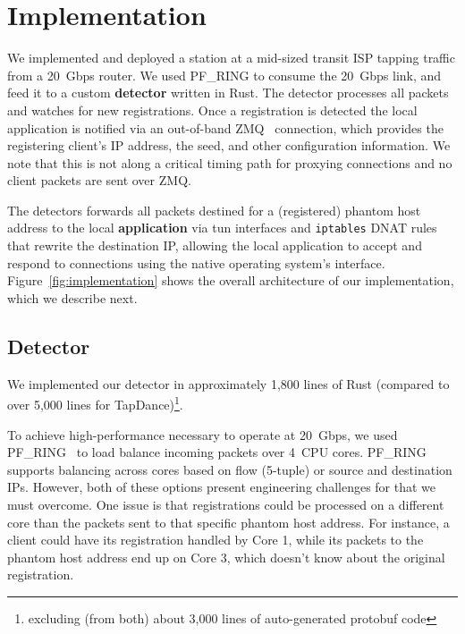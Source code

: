 \documentclass[sigconf]{acmart}
\begin{document}
\TabApplications


\section{Implementation}
\label{sec:implementation}

We implemented \scheme and deployed a station at a mid-sized transit ISP tapping 
traffic from a 20~Gbps router. We used PF\_RING to
consume the 20~Gbps link, and feed it to a custom \textbf{detector} written in Rust. The
detector processes all packets and watches for new registrations. Once a registration 
is detected the local application is notified via an 
out-of-band ZMQ~\cite{zmq} connection, which provides the
registering client's IP address, the seed, and other configuration
information. We note that this is not along a critical timing path for 
proxying connections and no client packets are sent over ZMQ.

The detectors forwards all packets destined for a (registered) phantom host address to the local
\textbf{application} via tun interfaces and \texttt{iptables} DNAT rules that rewrite the destination IP,
allowing the local application to accept and respond to connections using the native
operating system's interface. Figure~\ref{fig:implementation} shows the overall
architecture of our implementation, which we describe next.

\FigImplementation

\subsection{Detector}

We implemented our detector in approximately 1,800 lines of Rust (compared to
over 5,000 lines for TapDance)\footnote{excluding (from both) about 3,000 lines
of auto-generated protobuf code}.

To achieve high-performance necessary to operate at 20~Gbps, we used
PF\_RING~\cite{pfring} to load balance incoming packets over 4~CPU cores. PF\_RING
supports balancing across cores based on flow (5-tuple) or source and
destination IPs. However, both of these options present engineering challenges
for \scheme that we must overcome.
One issue is that registrations could be processed on a
different core than the packets sent to that specific phantom host address. For
instance, a client could have its registration handled by Core 1, while its
packets to the phantom host address end up on Core 3, which doesn't know about the
original registration.
\end{document}
